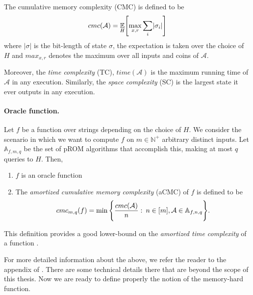 The cumulative memory complexity (CMC) is defined to be
\begin{equation}
    cmc(\mathcal{A}) = \underset{H}{\mathbb{E}} \Bigg{[} \underset{x,r}{\max} \sum_{i} \lvert \sigma_i \rvert \Bigg{]}
\end{equation}
where $\lvert \sigma \rvert$ is the bit-length of state $\sigma$, the expectation is taken over the choice of $H$ and $max_{x,r}$ denotes the maximum over all inputs and coins of $\mathcal{A}$.

Moreover, the \textit{time complexity} (TC), $time(\mathcal{A})$ is the maximum running time of $\mathcal{A}$ in any execution. Similarly, the \textit{space complexity} (SC) is the largest state it ever outputs in any execution.

\paragraph{Oracle function.} Let $f$ be a function over strings depending on the choice of $H$. We consider the scenario in which we want to compute $f$ on $m \in \mathbb{N}^{+}$ arbitrary distinct inputs.
Let $\mathbb{A}_{f,m,q}$ be the set of pROM algorithms that accomplish this, making at most $q$ queries to
$H$. Then,

\begin{enumerate}[label=(\alph*)]
  \item $f$ is an oracle function \\

  \item The \textit{amortized cumulative memory complexity} (aCMC) of $f$ is defined to be
  \begin{equation}
      cmc_{m,q}(f) = \min \Bigg{\{} \frac{cmc(\mathcal{A})}{n} : \: n \in [m], \mathcal{A} \in \mathbb{A}_{f,n,q} \Bigg{\}}.
  \end{equation}
\end{enumerate}
This definition provides a good lower-bound on the \textit{amortized time complexity} of a function \cite{Alwen:2015:HPC:2746539.2746622}.

For more detailed information about the above, we refer the reader to the appendix of \cite{cryptoeprint:2016:875}. There are some technical details there that are beyond the scope of this thesis. Now we are ready to define properly the notion of the memory-hard function.

